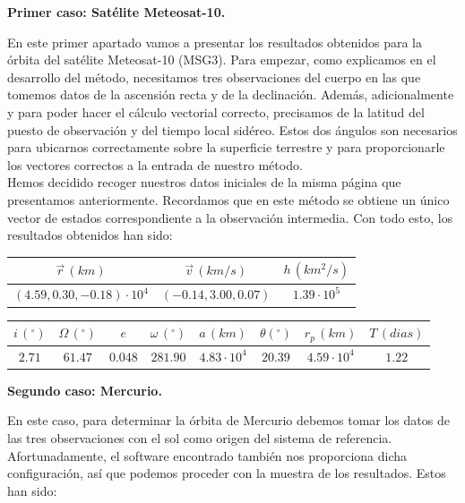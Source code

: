 \documentclass{article}
\numberwithin{equation}{section}
\begin{document}
\noindent\textbf{Primer caso: Satélite Meteosat-10.}

En este primer apartado vamos a presentar los resultados obtenidos para la órbita del satélite Meteosat-10 (MSG3). Para empezar, como explicamos en el desarrollo del método, necesitamos tres observaciones del cuerpo en las que tomemos datos de la ascensión recta y de la declinación. Además, adicionalmente y para poder hacer el cálculo vectorial correcto, precisamos de la latitud del puesto de observación y del tiempo local sidéreo. Estos dos ángulos son necesarios para ubicarnos correctamente sobre la superficie terrestre y para proporcionarle los vectores correctos a la entrada de nuestro método.\\

Hemos decidido recoger nuestros datos iniciales de la misma página que presentamos anteriormente. Recordamos que en este método se obtiene un único vector de estados correspondiente a la observación intermedia. Con todo esto, los resultados obtenidos han sido:

\begin{center}
    \centering
    \begin{tabular}{|c|c|c|}
    \hline
    $\overrightarrow{r}\, (km)$ & $\overrightarrow{v}\, (km/s)$ & $h\, ( km^{2}/s)$  \\ \hline
    $(4.59, 0.30, -0.18)\cdot10^4$ & $(-0.14, 3.00, 0.07)$ & $1.39 \cdot 10^{5}$\\ \hline
    \end{tabular}
\end{center}

\begin{center}
    \centering
    \begin{tabular}{|c|c|c|c|c|c|c|c|}
    \hline
     $i\, (^{\circ})$ & $\Omega\, (^\circ)$ & $e$ & $\omega\, (^\circ)$ & $a\, (km)$ & $\theta (^\circ)$ & $r_{p}\, (km)$ & $T\, (dias)$\\ \hline
    $2.71$ & $61.47$ & $ 0.048$ & $281.90$ & $4.83\cdot 10^{4}$ & $20.39$ & $4.59\cdot 10^{4}$ & $1.22$ \\ \hline
    \end{tabular}
\end{center}

\noindent\textbf{Segundo caso: Mercurio.}

En este caso, para determinar la órbita de Mercurio debemos tomar los datos de las tres observaciones con el sol como origen del sistema de referencia. Afortunadamente, el software encontrado también nos proporciona dicha configuración, así que podemos proceder con la muestra de los resultados. Estos han sido:
\end{document}
